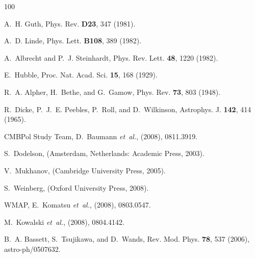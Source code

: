 \documentclass[12pt,letterpaper,rotate]{article}
\begin{document}
{%


\newpage


\begin{thebibliography}{100}

A.~H. Guth,
\newblock Phys. Rev. {\bf D23}, 347 (1981).

A.~D. Linde,
\newblock Phys. Lett. {\bf B108}, 389 (1982).

A.~Albrecht and P.~J. Steinhardt,
\newblock Phys. Rev. Lett. {\bf 48}, 1220 (1982).

E.~Hubble,
\newblock Proc. Nat. Acad. Sci. {\bf 15}, 168 (1929).

R.~A. Alpher, H.~Bethe, and G.~Gamow,
\newblock Phys. Rev. {\bf 73}, 803 (1948).

R.~Dicke, P.~J.~E. Peebles, P.~Roll, and D.~Wilkinson,
\newblock Astrophys. J. {\bf 142}, 414 (1965).

CMBPol Study Team, D.~Baumann {\em et~al.},
\newblock (2008), 0811.3919.

S.~Dodelson,
 (Amsterdam, Netherlands: Academic Press,
  2003).

V.~Mukhanov,
 (Cambridge University Press,
  2005).

S.~Weinberg,
 (Oxford University Press, 2008).

WMAP, E.~Komatsu {\em et~al.},
\newblock (2008), 0803.0547.

M.~Kowalski {\em et~al.},
\newblock (2008), 0804.4142.

B.~A. Bassett, S.~Tsujikawa, and D.~Wands,
\newblock Rev. Mod. Phys. {\bf 78}, 537 (2006), astro-ph/0507632.


\end{thebibliography}}
\end{document}
